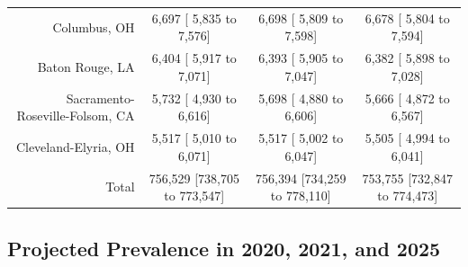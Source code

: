 \documentclass{article}
\begin{document}
\begin{table}[H]
\begin{tabular}{|r|c|c|c|}
		Columbus, OH &   6,697 [  5,835 to   7,576] &   6,698 [  5,809 to   7,598] &   6,678 [  5,804 to   7,594]\\
		Baton Rouge, LA &   6,404 [  5,917 to   7,071] &   6,393 [  5,905 to   7,047] &   6,382 [  5,898 to   7,028]\\
		Sacramento-Roseville-Folsom, CA &   5,732 [  4,930 to   6,616] &   5,698 [  4,880 to   6,606] &   5,666 [  4,872 to   6,567]\\
		Cleveland-Elyria, OH &   5,517 [  5,010 to   6,071] &   5,517 [  5,002 to   6,047] &   5,505 [  4,994 to   6,041]\\
		\hline
		Total & 756,529 [738,705 to 773,547] & 756,394 [734,259 to 778,110] & 753,755 [732,847 to 774,473]\\
		\hline
	\end{tabular}
\end{table}


\subsection{Projected Prevalence in 2020, 2021, and 2025}
\end{document}
